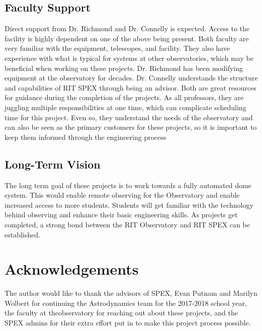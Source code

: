 \documentclass[conference]{IEEEtran} %
\begin{document}
\subsection{Faculty Support}
  Direct support from Dr. Richmond and Dr. Connelly is expected.
  Access to the facility is highly dependent on one of the above being present.
  Both faculty are very familiar with the equipment, telescopes, and facility.
  They also have experience with what is typical for systems at other observatories, which may be beneficial when working on these projects.
  Dr. Richmond has been modifying equipment at the observatory for decades.
  Dr. Connelly understands the structure and capabilities of RIT SPEX through being an advisor.
  Both are great resources for guidance during the completion of the projects.
  As all professors, they are juggling multiple responsibilities at one time, which can complicate scheduling time for this project.
  Even so, they understand the needs of the observatory and can also be seen as the primary customers for these projects, so it is important to keep them informed through the engineering process

\subsection{Long-Term Vision}
\label{sec:vision}
The long term goal of these projects is to work towards a fully automated dome system.
This would enable remote observing for the Observatory and enable increased access to more students.
Students will get familiar with the technology behind observing and enhance their basic engineering skills.
As projects get completed, a strong bond between the RIT Observatory and RIT SPEX can be established.

\section*{Acknowledgements}
The author would like to thank the advisors of SPEX, Evan Putnam and Marilyn Wolbert for continuing the Astrodynamics team for the 2017-2018 school year, the faculty at theobservatory for reaching out about these projects, and the SPEX admins for their extra effort put in to make this project process possible.
\end{document}
